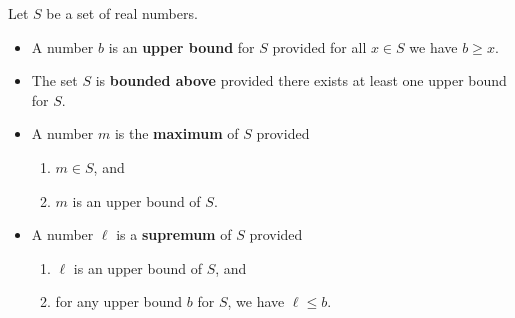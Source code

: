 \documentclass[12pt]{amsart}
\numberwithin{equation}{section}
\theoremstyle{plain} %
\theoremstyle{definition}
\theoremstyle{remark}
\begin{document}
\begin{framed}
Let $S$ be a set of real numbers. 
\begin{itemize}
\item A number $b$ is an \textbf{upper bound} for $S$ provided for all $x\in S$ we have $b\geq x$. 
\item The set $S$ is \textbf{bounded above} provided there exists at least one upper bound for $S$.
\item A number $m$ is the \textbf{maximum} of $S$ provided
\begin{enumerate}
\item $m\in S$, and
\item $m$ is an upper bound of $S$.
\end{enumerate}
\item A number $\ell$ is a \textbf{supremum} of $S$ provided
\begin{enumerate}
\item $\ell$ is an upper bound of $S$, and
\item for any upper bound $b$ for $S$, we have $\ell \leq b$.
\end{enumerate}
\end{itemize}
\end{framed}

\
\end{document}
